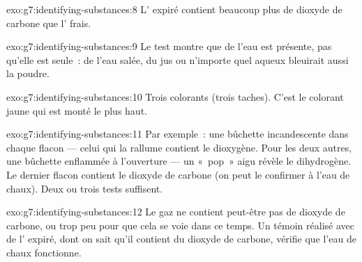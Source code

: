 \begin{solution}{exo:g7:identifying-substances:8}
L' expiré contient beaucoup plus de dioxyde de carbone que l'
frais.
\end{solution}

\begin{solution}{exo:g7:identifying-substances:9}
Le test montre que de l'eau est présente, pas qu'elle est seule~: de
l'eau salée, du jus ou n'importe quel  aqueux bleuirait aussi la
poudre.
\end{solution}

\begin{solution}{exo:g7:identifying-substances:10}
Trois colorants (trois taches). C'est le colorant jaune qui est monté le
plus haut.
\end{solution}

\begin{solution}{exo:g7:identifying-substances:11}
Par exemple~: une bûchette incandescente dans chaque flacon --- celui
qui la rallume contient le dioxygène. Pour les deux autres, une bûchette
enflammée à l'ouverture --- un «~pop~» aigu révèle le dihydrogène. Le
dernier flacon contient le dioxyde de carbone (on peut le confirmer à
l'eau de chaux). Deux ou trois tests suffisent.
\end{solution}

\begin{solution}{exo:g7:identifying-substances:12}
Le gaz ne contient peut-être pas de dioxyde de carbone, ou trop peu pour
que cela se voie dans ce temps. Un témoin réalisé avec de l' expiré,
dont on sait qu'il contient du dioxyde de carbone, vérifie que l'eau de
chaux fonctionne.
\end{solution}

